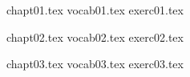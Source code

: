 \documentclass[12pt]{book}
\begin{document}
%
%
%

{chapt01.tex}
{vocab01.tex}
{exerc01.tex}

{chapt02.tex}
{vocab02.tex}
{exerc02.tex}


{chapt03.tex}
{vocab03.tex}
{exerc03.tex}

%
%
%
%
%
%
%
%
%
%
%
%
%
%
%
%
%
%
%
%
%
\end{document}
